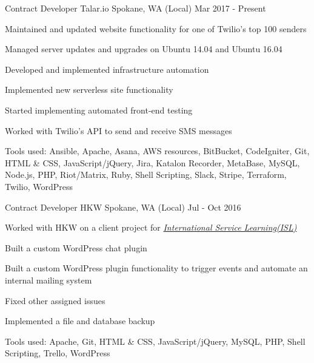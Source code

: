 \begin{cventries}
  \cventry
    {Contract Developer} %
    {Talar.io} %
    {Spokane, WA (Local)} %
    {Mar 2017 - Present} %
    {
      \begin{cvitems} %
        \item {Maintained and updated website functionality for one of Twilio's top 100 senders}
        \item {Managed server updates and upgrades on Ubuntu 14.04 and Ubuntu 16.04}
        \item {Developed and implemented infrastructure automation}
        \item {Implemented new serverless site functionality}
        \item {Started implementing automated front-end testing}
        \item {Worked with Twilio's API to send and receive SMS messages}
        \item {Tools used: Ansible, Apache, Asana, AWS resources, BitBucket, CodeIgniter, Git, HTML \& CSS, JavaScript/jQuery, Jira, Katalon Recorder, MetaBase, MySQL, Node.js, PHP, Riot/Matrix, Ruby, Shell Scripting, Slack, Stripe, Terraform, Twilio, WordPress}
      \end{cvitems}
    }

  \cventry
    {Contract Developer} %
    {HKW} %
    {Spokane, WA (Local)} %
    {Jul - Oct 2016} %
    {
      \begin{cvitems} %
        \item {Worked with HKW on a client project for \emph{\href{https://www.islonline.org/}{International Service Learning(ISL)}}}
        \item {Built a custom WordPress chat plugin}
        \item {Built a custom WordPress plugin functionality to trigger events and automate an internal mailing system}
        \item {Fixed other assigned issues}
        \item {Implemented a file and database backup}
        \item {Tools used: Apache, Git, HTML \& CSS, JavaScript/jQuery, MySQL, PHP, Shell Scripting, Trello, WordPress}
      \end{cvitems}
    }


\end{cventries}
